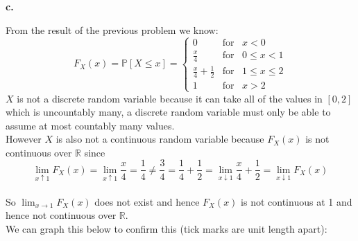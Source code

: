 \documentclass{article}
\begin{document}
\newpage
{\Large\textbf{c.}}
\begin{center}
\doublespacing
    From the result of the previous problem we know:
    \[F_X (x) =\mathbb{P}[X\leq x] =
    \begin{cases}
        0 & \mbox{for}\;\;\;x < 0 \\
        \frac{x}{4} & \mbox{for}\;\;\;0\leq x < 1 \\
        \frac{x}{4} +\frac{1}{2} & \mbox{for}\;\;\;1\leq x\leq 2 \\
        1 & \mbox{for}\;\;\;x > 2
    \end{cases}
    \]
    $X$ is not a discrete random variable because it can take all of the values in $[0,2]$ which is uncountably many, a discrete random variable must only be able to assume at most countably many values.
    \break
    \\However $X$ is also not a continuous random variable because $F_X (x)$ is not continuous over $\mathbb{R}$ since
    \[\lim_{x\uparrow 1} F_X (x) = \lim_{x\uparrow 1}\frac{x}{4} =\frac{1}{4}\neq\frac{3}{4} =\frac{1}{4} +\frac{1}{2} =\lim_{x\downarrow 1}\frac{x}{4} +\frac{1}{2} =\lim_{x\downarrow 1} F_X (x)\]
    \\So $\lim_{x\rightarrow 1} F_X (x)$ does not exist and hence $F_X (x)$ is not continuous at 1 and hence not continuous over $\mathbb{R}$.
    \break
    \\We can graph this below to confirm this (tick marks are unit length apart):
    \break\break\break
\end{center}


\newpage
\end{document}
